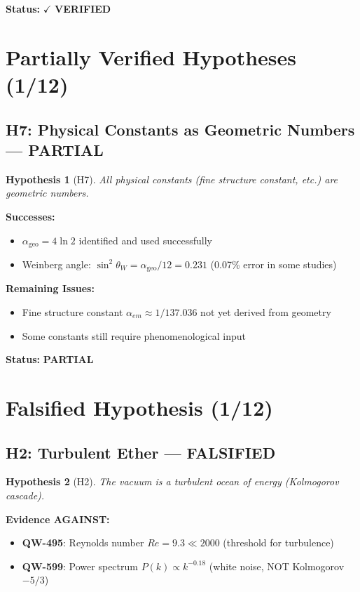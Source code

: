 \documentclass[11pt,a4paper]{book}
\newtheorem{hypothesis}{Hypothesis}[section]
\theoremstyle{remark}
\newcommand{\alphageo}{\alpha_{\text{geo}}}
\newcommand{\QW}[1]{\textbf{QW-#1}}
\begin{document}
\textbf{Status:} $\checkmark$ \textbf{VERIFIED}

\section{Partially Verified Hypotheses (1/12)}

\subsection{H7: Physical Constants as Geometric Numbers --- PARTIAL}

\begin{hypothesis}[H7]
All physical constants (fine structure constant, etc.) are geometric numbers.
\end{hypothesis}

\textbf{Successes:}
\begin{itemize}
    \item $\alphageo = 4\ln 2$ identified and used successfully
    \item Weinberg angle: $\sin^2\theta_W = \alphageo/12 = 0.231$ (0.07\% error in some studies)
\end{itemize}

\textbf{Remaining Issues:}
\begin{itemize}
    \item Fine structure constant $\alpha_{em} \approx 1/137.036$ not yet derived from geometry
    \item Some constants still require phenomenological input
\end{itemize}

\textbf{Status:} \textbf{PARTIAL}

\section{Falsified Hypothesis (1/12)}

\subsection{H2: Turbulent Ether --- FALSIFIED}

\begin{hypothesis}[H2]
The vacuum is a turbulent ocean of energy (Kolmogorov cascade).
\end{hypothesis}

\textbf{Evidence AGAINST:}
\begin{itemize}
    \item \QW{495}: Reynolds number $Re = 9.3 \ll 2000$ (threshold for turbulence)
    \item \QW{599}: Power spectrum $P(k) \propto k^{-0.18}$ (white noise, NOT Kolmogorov $-5/3$)
\end{itemize}
\end{document}
